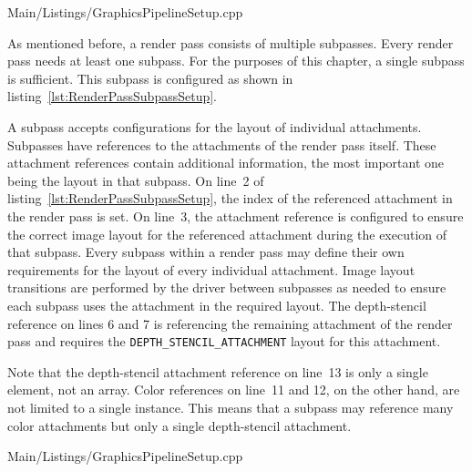         
        {Main/Listings/GraphicsPipelineSetup.cpp}

        As mentioned before, a render pass consists of multiple subpasses.
        Every render pass needs at least one subpass.
        For the purposes of this chapter, a single subpass is sufficient.
        This subpass is configured as shown in listing~\ref{lst:RenderPassSubpassSetup}.

        A subpass accepts configurations for the layout of individual attachments.
        Subpasses have references to the attachments of the render pass itself.
        These attachment references contain additional information, the most important one being the layout in that subpass.
        On line~2 of listing~\ref{lst:RenderPassSubpassSetup}, the index of the referenced attachment in the render pass is set.
        On line~3, the attachment reference is configured to ensure the correct image layout for the referenced attachment during the execution of that subpass.
        Every subpass within a render pass may define their own requirements for the layout of every individual attachment.
        Image layout transitions are performed by the \gls{driver} between subpasses as needed to ensure each subpass uses the attachment in the required layout.
        The depth-stencil reference on lines 6 and 7 is referencing the remaining attachment of the render pass and requires the \lstinline{DEPTH_STENCIL_ATTACHMENT} layout for this attachment.

        Note that the depth-stencil attachment reference on line~13 is only a single element, not an array.
        Color references on line~11 and 12, on the other hand, are not limited to a single instance.
        This means that a subpass may reference many color attachments but only a single depth-stencil attachment.

        
        {Main/Listings/GraphicsPipelineSetup.cpp}

